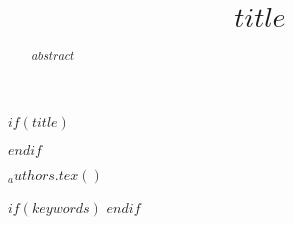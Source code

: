 $if(title)$
\title{$title$}
$endif$

$_authors.tex()$

\maketitle

\begin{abstract}
	$abstract$
\end{abstract}

$if(keywords)$
$endif$


